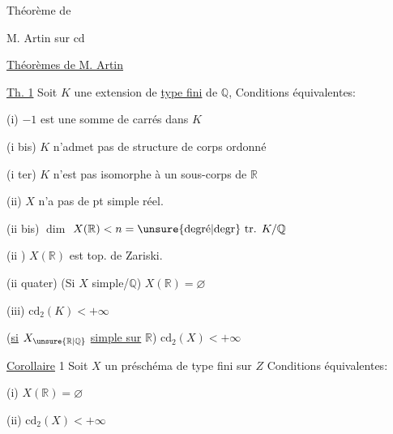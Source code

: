 Théorème de

M. Artin sur $\mathrm{cd}$


\uline{Théorèmes de M. Artin}

\uline{Th. 1} Soit $K$ une extension de \uline{type fini} de $\mathbb Q$, Conditions
équivalentes:

(i) $-1$ est une somme de carrés dans $K$

(i bis) $K$ n'admet pas de structure de corps ordonné

(i ter) $K$ n'est pas isomorphe à un sous-corps de $\mathbb R$

(ii)  $X$  n'a pas de pt simple réel.


(ii bis) 
$\dim$
$X(\mathbb R)<n=\text{\unsure{degré|degr} tr. }K/\mathbb Q$

(ii ) $X(\mathbb R)$ est  top. de Zariski.

(ii quater) (Si $X$ simple/$\mathbb Q$) \quad $X(\mathbb R)=\varnothing$

(iii) $\mathrm{cd}_2(K)<+\infty$

(\uline{si} $X_{\unsure{\mathbb R|\mathbb Q}}$ \uline{simple sur} $\mathbb R$) \quad $\mathrm{cd}_2(X)<+\infty$

\uline{Corollaire} 1 Soit $X$ un préschéma de type fini sur $Z$
 Conditions équivalentes:

(i) $X(\mathbb R)=\varnothing$

(ii) $\mathrm{cd}_2(X)<+\infty$


